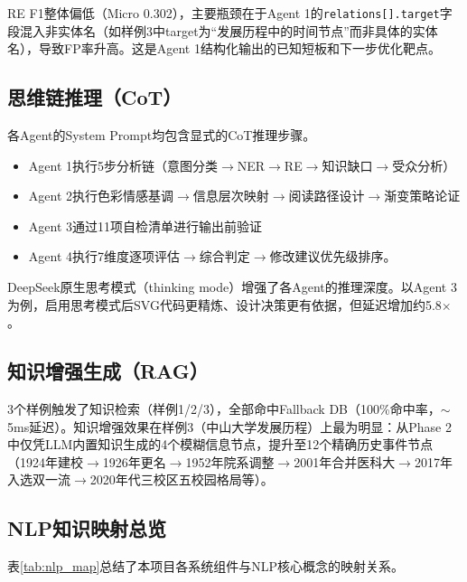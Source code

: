 \documentclass[11pt,a4paper]{article}
\begin{document}
RE F1整体偏低（Micro 0.302），主要瓶颈在于Agent 1的\texttt{relations[].target}字段混入非实体名（如样例3中target为“发展历程中的时间节点”而非具体的实体名），导致FP率升高。这是Agent 1结构化输出的已知短板和下一步优化靶点。

\subsection{思维链推理（CoT）}

各Agent的System Prompt均包含显式的CoT推理步骤。

\begin{itemize}
    \item Agent 1执行5步分析链（意图分类$\rightarrow$NER$\rightarrow$RE$\rightarrow$知识缺口$\rightarrow$受众分析）
    \item Agent 2执行色彩情感基调$\rightarrow$信息层次映射$\rightarrow$阅读路径设计$\rightarrow$渐变策略论证
    \item Agent 3通过11项自检清单进行输出前验证
    \item Agent 4执行7维度逐项评估$\rightarrow$综合判定$\rightarrow$修改建议优先级排序。
\end{itemize}

DeepSeek原生思考模式（thinking mode）增强了各Agent的推理深度。以Agent 3为例，启用思考模式后SVG代码更精炼、设计决策更有依据，但延迟增加约5.8$\times$。

\subsection{知识增强生成（RAG）}

3个样例触发了知识检索（样例1/2/3），全部命中Fallback DB（100\%命中率，$\sim$5ms延迟）。知识增强效果在样例3（中山大学发展历程）上最为明显：从Phase 2中仅凭LLM内置知识生成的4个模糊信息节点，提升至12个精确历史事件节点（1924年建校$\rightarrow$1926年更名$\rightarrow$1952年院系调整$\rightarrow$2001年合并医科大$\rightarrow$2017年入选双一流$\rightarrow$2020年代三校区五校园格局等）。

\subsection{NLP知识映射总览}

表\ref{tab:nlp_map}总结了本项目各系统组件与NLP核心概念的映射关系。
\end{document}
